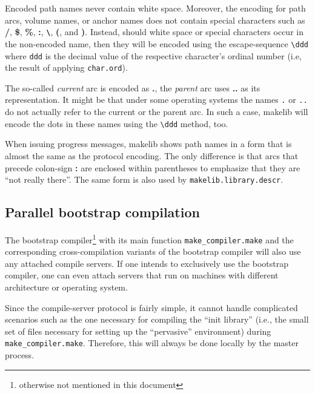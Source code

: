 Encoded path names never contain white space.  Moreover, the encoding
for path arcs, volume names, or anchor names does not contain special
characters such as {\bf /}, {\bf \$}, {\bf \%}, {\bf :}, {\bf
\verb|\|}, {\bf (}, and {\bf )}.  Instead, should white space or
special characters occur in the non-encoded name, then they will be
encoded using the escape-sequence \verb|\ddd| where {\tt ddd} is the
decimal value of the respective character's ordinal number (i.e, the
result of applying {\tt char.ord}).

The so-called {\em current} arc is encoded as {\bf .}, the {\em
parent} arc uses {\bf ..} as its representation.  It might be that
under some operating systems the names {\tt .} or {\tt ..} do not
actually refer to the current or the parent arc.  In such a case, makelib
will encode the dots in these names using the \verb|\ddd| method, too.

When issuing progress messages, makelib shows path names in a form that is
almost the same as the protocol encoding.  The only difference is that
arcs that precede colon-sign {\bf :} are enclosed within parentheses
to emphasize that they are ``not really there''.  The same form is
also used by {\tt makelib.library.descr}.

\subsection{Parallel bootstrap compilation}

The bootstrap compiler\footnote{otherwise not mentioned in this
document} with its main function {\tt make_compiler.make} and the corresponding
cross-compilation variants of the bootstrap compiler will also use any
attached compile servers.  If one intends to exclusively use the
bootstrap compiler, one can even attach servers that run on machines
with different architecture or operating system.

Since the compile-server protocol is fairly simple, it cannot handle
complicated scenarios such as the one necessary for compiling the
``init library'' (i.e., the small set of files necessary for setting up
the ``pervasive'' environment) during {\tt make_compiler.make}.  Therefore, this
will always be done locally by the master process.
